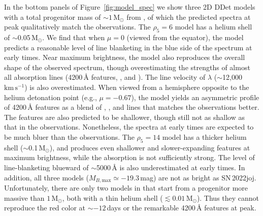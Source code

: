 \documentclass[twocolumn]{aastex631}
\newcommand{\sn}{SN\,2022joj}
\newcommand{\kms}{$\mathrm{km}\,\mathrm{s}^{-1}$}
\begin{document}
\begin{CJK*}{UTF8}{gbsn}

In the bottom panels of Figure~\ref{fig:model_spec} we show three 2D DDet models with a total progenitor mass of $\sim$$1\,\mathrm{M_\odot}$ from \citet{Shen_2D_2021}, of which the predicted spectra at peak qualitatively match the observations. The $\rho_5=6$ model has a helium shell of $\sim$0.05$\,\mathrm{M_\odot}$. We find that when $\mu=0$ (viewed from the equator), the model predicts a reasonable level of line blanketing in the blue side of the spectrum at early times. Near maximum brightness, the model also reproduces the overall shape of the observed spectrum, though overestimating the strengths of almost all absorption lines (4200\,\r{A} features, , and ). The line velocity of  $\lambda$ ($\sim$12,000\,\kms) is also overestimated. When viewed from a hemisphere opposite to the helium detonation point (e.g., $\mu=-0.67$), the model yields an asymmetric profile of 4200\,\r{A} features as a blend of , , and  lines that matches the observations better. The  features are also predicted to be shallower, though still not as shallow as that in the observations. Nonetheless, the spectra at early times are expected to be much bluer than the observations. The $\rho_5=14$ model has a thicker helium shell ($\sim$0.1\,$\mathrm{M_\odot}$), and produces even shallower and slower-expanding  features at maximum brightness, while the  absorption is not sufficiently strong. The level of line-blanketing blueward of $\sim$5000\,\r{A} is also underestimated at early times. In addition, all three models ($M_{B,\mathrm{max}}\simeq -19.3$\,mag) are not as bright as \sn. Unfortunately, there are only two models in \citet{Shen_2D_2021} that start from a progenitor more massive than $1\,\mathrm{M_\odot}$, both with a thin helium shell ($\lesssim$$0.01\,\mathrm{M_\odot}$). Thus they cannot reproduce the red color at $\sim$$-12$\,days or the remarkable 4200\,\r{A} features at peak.


\end{CJK*}
\end{document}
